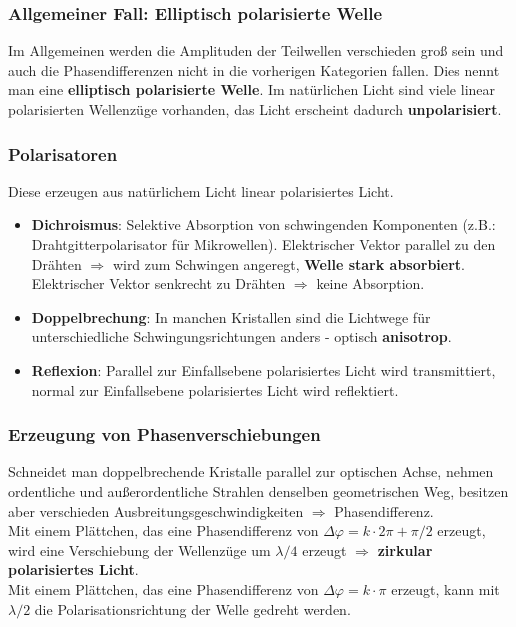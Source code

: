 \documentclass[12pt,a4paper,ngerman]{article}
\begin{document}
\subsubsection*{Allgemeiner Fall: Elliptisch polarisierte Welle}
Im Allgemeinen werden die Amplituden der Teilwellen verschieden groß sein und auch die Phasendifferenzen nicht in die vorherigen Kategorien fallen. Dies nennt man eine \textbf{elliptisch polarisierte Welle}. Im natürlichen Licht sind viele linear polarisierten Wellenzüge vorhanden, das Licht erscheint dadurch \textbf{unpolarisiert}. 

\subsubsection{Polarisatoren}
Diese erzeugen aus natürlichem Licht linear polarisiertes Licht.
\begin{itemize}
\item \textbf{Dichroismus}: Selektive Absorption von schwingenden Komponenten (z.B.: Drahtgitterpolarisator für Mikrowellen). Elektrischer Vektor parallel zu den Drähten $\Rightarrow$ wird zum Schwingen angeregt, \textbf{Welle stark absorbiert}. Elektrischer Vektor senkrecht zu Drähten $\Rightarrow$ keine Absorption. 
\item \textbf{Doppelbrechung}: In manchen Kristallen sind die Lichtwege für unterschiedliche Schwingungsrichtungen anders - optisch \textbf{anisotrop}.
\item \textbf{Reflexion}: Parallel zur Einfallsebene polarisiertes Licht wird transmittiert, normal zur Einfallsebene polarisiertes Licht wird reflektiert.
\end{itemize}

\subsubsection{Erzeugung von Phasenverschiebungen}
Schneidet man doppelbrechende Kristalle parallel zur optischen Achse, nehmen ordentliche und außerordentliche Strahlen denselben geometrischen Weg, besitzen aber verschieden Ausbreitungsgeschwindigkeiten $ \Rightarrow$ Phasendifferenz. \\
Mit einem Plättchen, das eine Phasendifferenz von $\Delta \varphi = k\cdot 2\pi + \pi/2$ erzeugt, wird eine Verschiebung der Wellenzüge um $\lambda/4$ erzeugt $\Rightarrow$ \textbf{zirkular polarisiertes Licht}. \\
Mit einem Plättchen, das eine Phasendifferenz von $\Delta \varphi = k \cdot \pi$ erzeugt, kann mit $\lambda/2$ die Polarisationsrichtung der Welle gedreht werden. 
\end{document}
